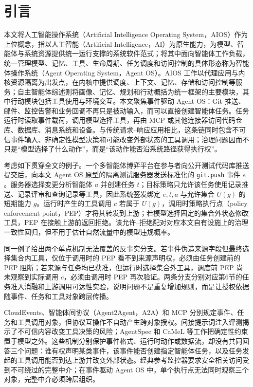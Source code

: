 \section*{引言}\label{sec:introduction-v11}

本文将人工智能操作系统（Artificial Intelligence Operating System，AIOS）作为上位概念，指以人工智能（Artificial Intelligence，AI）为原生能力，为模型、智能体与系统资源提供统一运行支撑的系统软件范式；将其中面向智能体工作负载，统一管理模型、记忆、工具、生命周期、任务调度和访问控制的具体形态称为智能体操作系统（Agent Operating System，Agent OS）。AIOS 工作以代理应用与内核资源隔离为出发点，在内核中提供调度、上下文、记忆、存储和访问控制等服务\cite{aios}；自主智能体综述则将画像、记忆、规划和行动概括为统一框架的主要模块，其中行动模块包括工具使用与环境交互\cite{agent-survey}。本文聚焦事件驱动 Agent OS：Git 推送、邮件、监控告警和业务回调不再只是被动输入，而可以直接创建智能体任务。任务运行时读取事件载荷，调用模型选择工具，再由 MCP 或其他连接器访问代码仓库、数据库、消息系统和设备。与传统请求--响应应用相比，这条链同时包含不可信事件输入、非确定性模型决策和可能改变外部状态的工具调用；治理问题因而不只是“模型选择了什么动作”，而是“该动作能否沿系统路径获得执行权”。

考虑如下贯穿全文的例子。一个多智能体博弈平台在参与者向公开测试代码库推送提交后，向本文 Agent OS 原型的隔离测试服务器发送标准化的 \texttt{git.push} 事件 $e$。服务器选择变更分析智能体 $a$ 并创建任务 $t$；目标策略只允许该任务使用记录推送、记录评审和查询记录等工具，因此系统签发绑定 $e,t,a$ 与允许集合 $U(g)$ 的短期能力 $g$。运行时产生的工具调用 $c$ 若属于 $U(g)$，调用时策略执行点（policy enforcement point，PEP）才将其转发到上游；若模型选择固定的集合外状态修改工具，PEP 在接触上游前返回拒绝。该允许--拒绝配对对应本文自有设施上的治理一致性回归，但不用于估计自然流量中的模型违规概率。

同一例子给出两个单点机制无法覆盖的反事实分支。若事件伪造来源字段但最终选择集合内工具，仅位于调用时的 PEP 看不到来源声明权，必须由任务创建前的 PEP 阻断；若来源与任务均已获准，但运行时选择集合外工具，调度前 PEP 尚未观察到实际调用 $c$，必须由调用时 PEP 再次验证。两条分支分别对应第6节的任务准入消融和上游调用可达性实验，说明问题不是重复增加规则，而是让授权依据随事件、任务和工具对象跨层传播。

CloudEvents、智能体间协议（Agent2Agent，A2A）和 MCP 分别规定事件、任务和工具调用对象\cite{cloudevents,a2a,mcp}，但协议互操作不自动产生跨对象授权。间接提示词注入评测揭示了不可信内容改变工具决策的风险\cite{indirect-pi,injecagent,agentdojo,toolemu}；AgentSpec 和 CaMeL 等工作把确定性约束置于模型之外\cite{agentspec,camel}。这些机制分别保护事件格式、运行时动作或数据流，却没有共同回答三个问题：谁有权声明某类事件，该事件能否创建指定智能体任务，以及任务发起的工具调用能否到达上游并改变外部状态。经典参考监控器要求安全相关访问受到不可绕过的完整中介\cite{reference-monitor,saltzer-schroeder}；在事件驱动 Agent OS 中，单个执行点无法同时观察三个对象，完整中介必须跨层组织。

